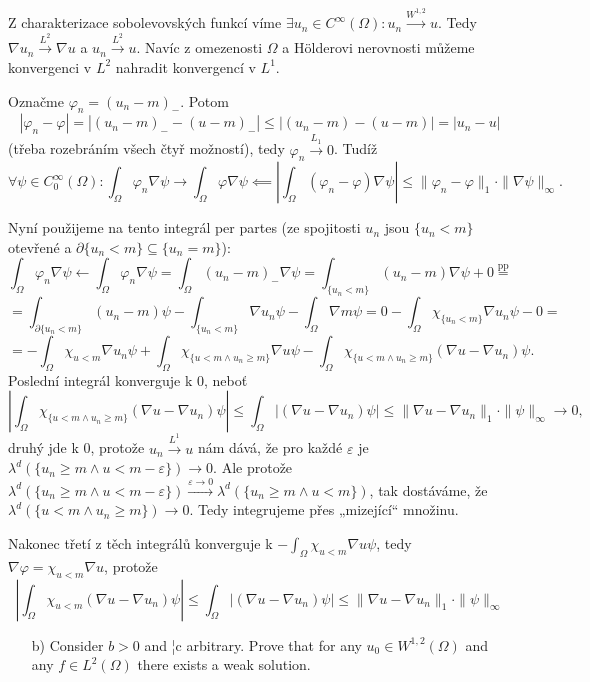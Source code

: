 \documentclass[12pt]{article}					%
\begin{document}
\begin{priklad}
	\begin{dukazin}[$\nabla φ = χ_{\{u < m\}}\nabla u$]
		Z charakterizace sobolevovských funkcí víme $\exists u_n \in C^∞(Ω): u_n \overset{W^{1, 2}}\rightarrow u$. Tedy $\nabla u_n \overset{L^2}\rightarrow \nabla u$ a $u_n \overset{L^2}\rightarrow u$. Navíc z omezenosti $Ω$ a Hölderovi nerovnosti můžeme konvergenci v $L^2$ nahradit konvergencí v $L^1$.

		Označme $φ_n = (u_n - m)_-$. Potom
		$$ |φ_n - φ| = |(u_n - m)_- - (u - m)_-| ≤ |(u_n - m) - (u - m)| = |u_n - u| $$
		(třeba rozebráním všech čtyř možností), tedy $φ_n \overset{L_1}\rightarrow 0$. Tudíž
		$$ \forall ψ \in C^∞_0(Ω): \int_Ω φ_n \nabla ψ \rightarrow \int_Ω φ \nabla ψ \impliedby \left|\int_Ω (φ_n - φ) \nabla ψ\right| ≤ \|φ_n - φ\|_1 · \|\nabla ψ\|_∞. $$

		Nyní použijeme na tento integrál per partes (ze spojitosti $u_n$ jsou $\{u_n < m\}$ otevřené a $\partial\{u_n < m\} \subseteq \{u_n = m\}$):
		$$ \int_Ω φ_n \nabla ψ \leftarrow \int_Ω φ_n \nabla ψ = \int_Ω (u_n - m)_- \nabla ψ = \int_{\{u_n < m\}} (u_n - m) \nabla ψ + 0 \overset{\text{pp}}= $$
		$$ = \int_{\partial\{u_n < m\}} (u_n - m) ψ - \int_{\{u_n < m\}} \nabla u_n ψ - \int_Ω \nabla m ψ = 0 - \int_Ω χ_{\{u_n < m\}} \nabla u_n ψ - 0 = $$
		$$ = - \int_Ω χ_{u < m} \nabla u_n ψ + \int_Ω χ_{\{u < m \land u_n ≥ m\}}\nabla u ψ - \int_Ω χ_{\{u < m \land u_n ≥ m\}}(\nabla u - \nabla u_n) ψ. $$
		Poslední integrál konverguje k 0, neboť
		$$ \left|\int_Ω χ_{\{u < m \land u_n ≥ m\}}(\nabla u - \nabla u_n) ψ\right| ≤ \int_Ω |(\nabla u - \nabla u_n)ψ| ≤ \|\nabla u - \nabla u_n\|_1 · \|ψ\|_∞ \rightarrow 0, $$
		druhý jde k 0, protože $u_n \overset{L^1}\rightarrow u$ nám dává, že pro každé $ε$ je $λ^d(\{u_n ≥ m \land u < m - ε\}) \rightarrow 0$. Ale protože $λ^d(\{u_n ≥ m \land u < m - ε\}) \overset{ε \rightarrow 0}\rightarrow λ^d(\{u_n ≥ m \land u < m\})$, tak dostáváme, že $λ^d(\{u < m \land u_n ≥ m\}) \rightarrow 0$. Tedy integrujeme přes „mizející“ množinu.

		Nakonec třetí z těch integrálů konverguje k $- \int_Ω χ_{u < m} \nabla u ψ$, tedy $\nabla φ = χ_{u < m} \nabla u$, protože
		$$ \left|\int_Ω χ_{u < m} (\nabla u - \nabla u_n) ψ\right| ≤ \int_Ω |(\nabla u - \nabla u_n) ψ| ≤ \|\nabla u - \nabla u_n\|_1·\|ψ\|_∞ $$
	\end{dukazin}

\newpage

	\begin{itemize}
		\item[b)] Consider $b > 0$ and ¦c arbitrary. Prove that for any $u_0 \in W^{1, 2}(Ω)$ and any $f \in L^2(Ω)$ there exists a weak solution.
	\end{itemize}


\end{priklad}
\end{document}
